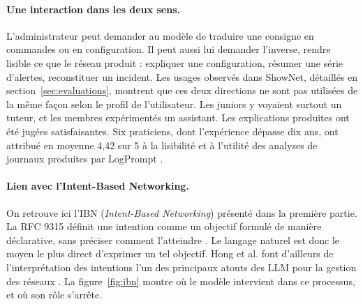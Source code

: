\paragraph{Une interaction dans les deux sens.}
L'administrateur peut demander au modèle de traduire une consigne en commandes ou en configuration. Il peut aussi lui demander l'inverse, rendre lisible ce que le réseau produit : expliquer une configuration, résumer une série d'alertes, reconstituer un incident. Les usages observés dans ShowNet, détaillés en section~\ref{sec:evaluations}, montrent que ces deux directions ne sont pas utilisées de la même façon selon le profil de l'utilisateur. Les juniors y voyaient surtout un tuteur, et les membres expérimentés un assistant. Les explications produites ont été jugées satisfaisantes. Six praticiens, dont l'expérience dépasse dix ans, ont attribué en moyenne 4,42 sur 5 à la lisibilité et à l'utilité des analyses de journaux produites par LogPrompt \cite{liu2024}.

\paragraph{Lien avec l'Intent-Based Networking.}
On retrouve ici l'IBN (\emph{Intent-Based Networking}) présenté dans la première partie. La RFC 9315 définit une intention comme un objectif formulé de manière déclarative, sans préciser comment l'atteindre \cite{clemm2022}. Le langage naturel est donc le moyen le plus direct d'exprimer un tel objectif. Hong et al. font d'ailleurs de l'interprétation des intentions l'un des principaux atouts des LLM pour la gestion des réseaux \cite{hong2025}. La figure~\ref{fig:ibn} montre où le modèle intervient dans ce processus, et où son rôle s'arrête.

